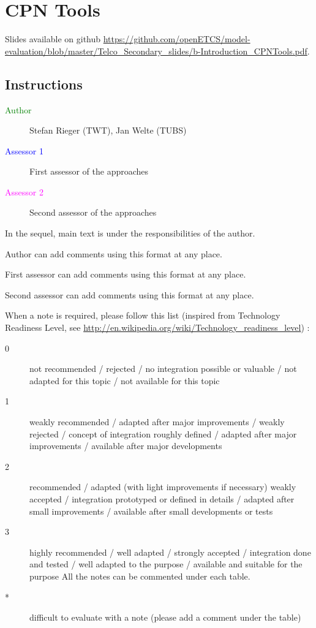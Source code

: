 \chapter{CPN Tools}
\label{sec:cpntools}

Slides available on github \url{https://github.com/openETCS/model-evaluation/blob/master/Telco_Secondary_slides/b-Introduction_CPNTools.pdf}.

\section{Instructions}

\begin{description}
\item[\textcolor{green}{Author}] Stefan Rieger (TWT), Jan Welte (TUBS)
\item[\textcolor{blue}{Assessor 1}] First assessor of the approaches 
\item[\textcolor{magenta}{Assessor 2}] Second assessor of the approaches 
\end{description}

In the sequel, main text is under the responsibilities of the author.

\begin{author_comment}
Author can add comments using this format at any place.
\end{author_comment}

\begin{assessor1}
First assessor can add comments using this format at any place.
\end{assessor1}

\begin{assessor2}
Second assessor can add comments using this format at any place.
\end{assessor2}

When a note is required, please follow this list (inspired from Technology Readiness Level, see \url{http://en.wikipedia.org/wiki/Technology\_readiness\_level}) :

\begin{description}
\item[0] not recommended / rejected / no integration possible or valuable / not adapted for this topic / not available for this topic
\item[1] weakly recommended / adapted after major improvements / weakly rejected / concept of integration roughly defined / adapted after major improvements / available after major developments
\item[2] recommended / adapted (with light improvements if necessary)  weakly accepted / integration prototyped or defined in details / adapted after small improvements / available after small developments or tests
\item[3] highly recommended / well adapted / strongly accepted / integration done and tested / well adapted to the purpose / available and suitable for the purpose All the notes can be commented under each table.
\item[*] difficult to evaluate with a note (please add a comment under the table)
\end{description}


